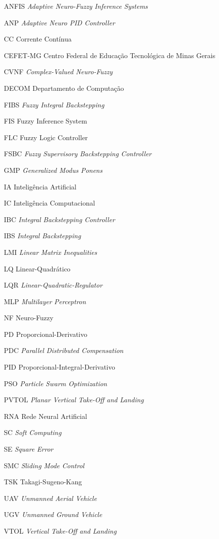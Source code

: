 %
%

\begin{siglas}
    \item[ANFIS] \textit{Adaptive Neuro-Fuzzy Inference Systems}
    \item[ANP] \textit{Adaptive Neuro PID Controller}
    \item[CC] Corrente Contínua
    \item[CEFET-MG] Centro Federal de Educação Tecnológica de Minas Gerais
    \item[CVNF] \textit{Complex-Valued Neuro-Fuzzy}
    \item[DECOM] Departamento de Computação
    \item[FIBS] \textit{Fuzzy Integral Backstepping}
    \item[FIS] Fuzzy Inference System
    \item[FLC] Fuzzy Logic Controller
    \item[FSBC] \textit{Fuzzy Supervisory Backstepping Controller}
    \item[GMP] \textit{Generalized Modus Ponens}
    \item[IA] Inteligência Artificial
    \item[IC] Inteligência Computacional
    \item[IBC] \textit{Integral Backstepping Controller}
    \item[IBS] \textit{Integral Backstepping}
    \item[LMI] \textit{Linear Matrix Inequalities}
    \item[LQ] Linear-Quadrático
    \item[LQR] \textit{Linear-Quadratic-Regulator}
    \item[MLP] \textit{Multilayer Perceptron}
    \item[NF] Neuro-Fuzzy
    \item[PD] Proporcional-Derivativo
    \item[PDC] \textit{Parallel Distributed Compensation}
    \item[PID] Proporcional-Integral-Derivativo
    \item[PSO] \textit{Particle Swarm Optimization}
    \item[PVTOL] \textit{Planar Vertical Take-Off and Landing}
    \item[RNA] Rede Neural Artificial
    \item[SC] \textit{Soft Computing}
    \item[SE] \textit{Square Error}
    \item[SMC] \textit{Sliding Mode Control}
    \item[TSK] Takagi-Sugeno-Kang
    \item[UAV] \textit{Unmanned Aerial Vehicle}
    \item[UGV] \textit{Unmanned Ground Vehicle}
    \item[VTOL] \textit{Vertical Take-Off and Landing}
\end{siglas}

